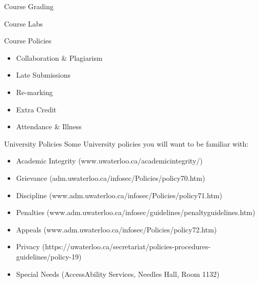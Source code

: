 \documentclass{beamer}
\begin{document}
	\begin{frame}{Course Grading}
		
	\end{frame}
	
	\begin{frame}{Course Labs}
		
	\end{frame}
  
	\begin{frame}{Course Policies}
		\begin{itemize}
			\setlength\itemsep{1em}
			\item Collaboration \& Plagiarism
			\item Late Submissions
			\item Re-marking
			\item Extra Credit
			\item Attendance \& Illness
		\end{itemize}
	\end{frame}
	
	\begin{frame}{University Policies}
		Some University policies you will want to be familiar with:
		\vspace{1em}
		\begin{itemize}
			\setlength\itemsep{0.75em}
			\item \normalsize{Academic Integrity} \tiny{(www.uwaterloo.ca/academicintegrity/)}
			\item \normalsize{Grievance} \tiny{(adm.uwaterloo.ca/infosec/Policies/policy70.htm)}
			\item \normalsize{Discipline} \tiny{(www.adm.uwaterloo.ca/infosec/Policies/policy71.htm)}
			\item \normalsize{Penalties} \tiny{(www.adm.uwaterloo.ca/infosec/guidelines/penaltyguidelines.htm)}
			\item \normalsize{Appeals} \tiny{(www.adm.uwaterloo.ca/infosec/Policies/policy72.htm)}
			\item \normalsize{Privacy} \tiny{(https://uwaterloo.ca/secretariat/policies-procedures-guidelines/policy-19)}
			\item \normalsize{Special Needs} \tiny{(AccessAbility Services, Needles Hall, Room 1132)}
		\end{itemize}
	\end{frame}  
\end{document}
